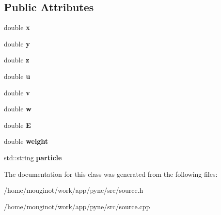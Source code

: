 \subsection*{Public Attributes}
\begin{DoxyCompactItemize}
\item 
\mbox{\label{classpyne_1_1_point_source_a8d7bbea0f1d83a381cab2cd580713ffc}} 
double {\bfseries x}
\item 
\mbox{\label{classpyne_1_1_point_source_a1d46c0f2f36e000d424ffead934b5fa6}} 
double {\bfseries y}
\item 
\mbox{\label{classpyne_1_1_point_source_ad23cfca0efda40027885e1686bacc35e}} 
double {\bfseries z}
\item 
\mbox{\label{classpyne_1_1_point_source_a6c865fed8f3651d9c5ee310ccf906e94}} 
double {\bfseries u}
\item 
\mbox{\label{classpyne_1_1_point_source_a83fc0c0a52903ee06533a3fbfa127f06}} 
double {\bfseries v}
\item 
\mbox{\label{classpyne_1_1_point_source_a1df602fc5134a9c87bd8f42e2f4bab14}} 
double {\bfseries w}
\item 
\mbox{\label{classpyne_1_1_point_source_af2f4227fcfb78d54210918dc21464169}} 
double {\bfseries E}
\item 
\mbox{\label{classpyne_1_1_point_source_ad1d071c1daabc91138e3614c86ed0f3b}} 
double {\bfseries weight}
\item 
\mbox{\label{classpyne_1_1_point_source_a0be18b0728be5e56e250248754f9bd04}} 
std\+::string {\bfseries particle}
\end{DoxyCompactItemize}


The documentation for this class was generated from the following files\+:\begin{DoxyCompactItemize}
\item 
/home/mouginot/work/app/pyne/src/source.\+h\item 
/home/mouginot/work/app/pyne/src/source.\+cpp\end{DoxyCompactItemize}
